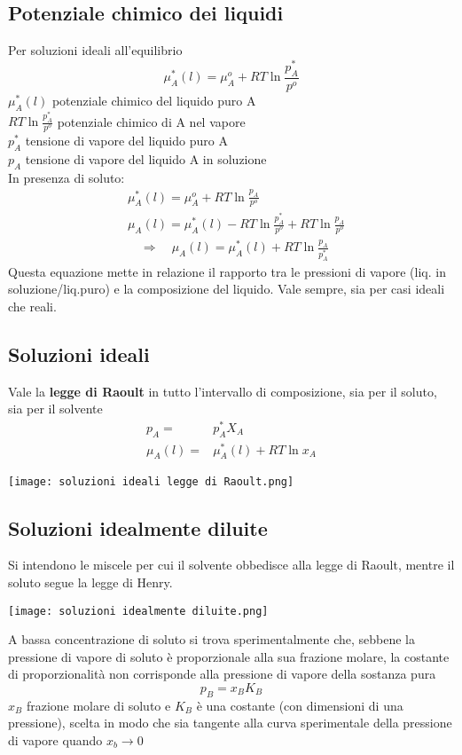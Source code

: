 \documentclass{article}
\newcommand{\So}{\quad \Rightarrow \quad}
\begin{document}
\subsection{Potenziale chimico dei liquidi}
Per soluzioni ideali all'equilibrio
\begin{equation*}
    \mu_A^*(l)=\mu_A^o+RT\ln \frac{p_A^*}{p^o}
\end{equation*}
$\mu_A^*(l)$ potenziale chimico del liquido puro A\\
$RT\ln \frac{p_A^*}{p^o}$ potenziale chimico di A nel vapore\\
$p_A^*$ tensione di vapore del liquido puro A\\
$p_A$ tensione di vapore del liquido A in soluzione\\

In presenza di soluto:
\begin{align*}
    &\mu_A^*(l)=\mu_A^o+RT\ln \frac{p_A}{p^o} \\
    &\mu_A(l)=\mu_A^*(l)-RT\ln \frac{p_A^*}{p^o}+RT\ln \frac{p_A}{p^o}\\
    &\So \mu_A(l)=\mu_A^*(l)+RT\ln\frac{p_A}{p_A^*}
\end{align*}
Questa equazione mette in relazione il rapporto tra le pressioni di vapore (liq. in soluzione/liq.puro) e la composizione del liquido. Vale sempre, sia per casi ideali che reali.

\subsection{Soluzioni ideali}
Vale la \textbf{legge di Raoult} in tutto l'intervallo di composizione, sia per il soluto, sia per il solvente
\begin{align*}
    p_A=&p_A^*X_A\\
    \mu_A(l)=&\mu_A^*(l)+RT\ln x_A
\end{align*}
\begin{center}
    \texttt{[image: soluzioni ideali legge di Raoult.png]}
\end{center}

\subsection{Soluzioni idealmente diluite}
Si intendono le miscele per cui il solvente obbedisce alla legge di Raoult, mentre il soluto segue la legge di Henry.
\begin{center}
    \texttt{[image: soluzioni idealmente diluite.png]}
\end{center}
A bassa concentrazione di soluto si trova sperimentalmente che, sebbene la pressione di vapore di soluto è proporzionale alla sua frazione molare, la costante di proporzionalità non corrisponde alla pressione di vapore della sostanza pura
\begin{equation*}
    p_B=x_BK_B
\end{equation*}
$x_B$ frazione molare di soluto e $K_B$ è una costante (con dimensioni di una pressione), scelta in modo che sia tangente alla curva sperimentale della pressione di vapore quando $x_b \to 0$
\end{document}
